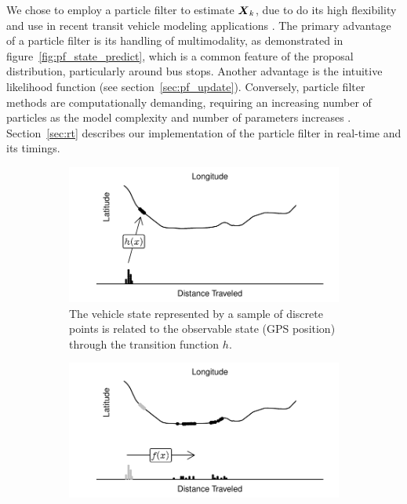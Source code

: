 We chose to employ a particle filter to estimate $\mbox{$\boldsymbol{X}$}_k$,
due to do its high flexibility and use in recent 
transit vehicle modeling applications \citep{Hans_2015}.
The primary advantage of a particle filter is its handling of multimodality,
as demonstrated in figure~\ref{fig:pf_state_predict},
which is a common feature of the proposal distribution, particularly around bus stops.
Another advantage is the intuitive likelihood function (see section~\ref{sec:pf_update}).
Conversely, particle filter methods are computationally demanding,
requiring an increasing number of particles as the model complexity and
number of parameters increases \citep{Carpenter_1999}.
Section~\ref{sec:rt} describes our implementation of the particle filter in real-time 
and its timings.



\begin{figure}[tb]
    \centering
    \begin{subfigure}[t]{0.48\textwidth}
        \centering
        \includegraphics[width=\textwidth]{figures/03_particle_filter_1.pdf}
        \caption{The vehicle state represented by a sample of discrete points is related to the observable state (GPS position) through the transition function $h$.}
        \label{fig:pf_state_prev}
    \end{subfigure}\;\;
    \begin{subfigure}[t]{0.48\textwidth}
        \centering
        \includegraphics[width=\textwidth]{figures/03_particle_filter_2.pdf}

\end{subfigure}
\end{figure}
